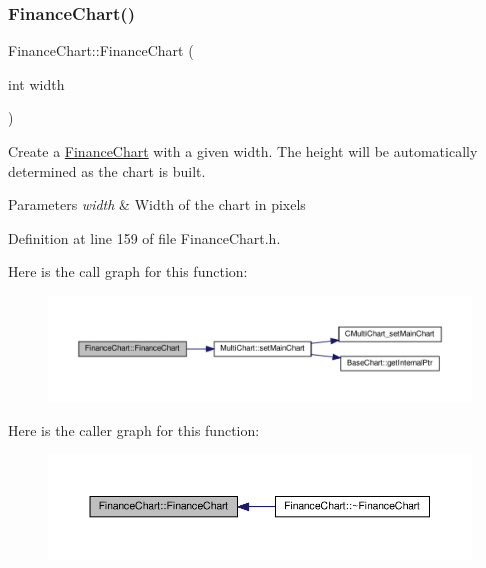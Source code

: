 \subsubsection{\texorpdfstring{Finance\+Chart()}{FinanceChart()}}
{\footnotesize\ttfamily Finance\+Chart\+::\+Finance\+Chart (\begin{DoxyParamCaption}\item[{int}]{width }\end{DoxyParamCaption})\hspace{0.3cm}{\ttfamily [inline]}}



Create a \hyperlink{class_finance_chart}{Finance\+Chart} with a given width. The height will be automatically determined as the chart is built. 


\begin{DoxyParams}{Parameters}
{\em width} & Width of the chart in pixels\\
\hline
\end{DoxyParams}


Definition at line 159 of file Finance\+Chart.\+h.

Here is the call graph for this function\+:
\nopagebreak
\begin{figure}[H]
\begin{center}
\leavevmode
\includegraphics[width=350pt]{class_finance_chart_a044a1d55c37501ea29ed2b5916faf0e1_cgraph}
\end{center}
\end{figure}
Here is the caller graph for this function\+:
\nopagebreak
\begin{figure}[H]
\begin{center}
\leavevmode
\includegraphics[width=350pt]{class_finance_chart_a044a1d55c37501ea29ed2b5916faf0e1_icgraph}
\end{center}
\end{figure}
\mbox{\label{class_finance_chart_a1e7439001aaf137a55e33a1add07f1eb}} 
